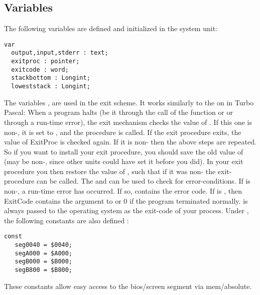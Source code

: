 \documentclass{report}
\begin{document}
\subsection{Variables}
The following variables are defined and initialized in the system unit:
\begin{verbatim}
var
  output,input,stderr : text;
  exitproc : pointer;
  exitcode : word;
  stackbottom : Longint;
  loweststack : Longint;
\end{verbatim}
The variables ,  are used in the \fpc exit
scheme. It works similarly to the on in Turbo Pascal:
When a program halts (be it through the call of the  function or
 or through a run-time error), the exit mechanism checks the value
of . If this one is non-, it is set to , and
the procedure is called. If the exit procedure exits, the value of ExitProc
is checked again. If it is non- then the above steps are repeated.
So if you want to install your exit procedure, you should save the old value
of  (may be non-, since other units could have set it before
you did). In your exit procedure you then restore the value of
, such that if it was non- the exit-procedure can be
called.
The  and  can be used to check for
error-conditions. If  is non-, a run-time error has
occurred. If so,  contains the error code. If  is
, then {ExitCode} contains the argument to  or 0 if the
program terminated normally.
 is always passed to the operating system as the exit-code of
your process.
Under , the following constants are also defined :
\begin{verbatim}
const
   seg0040 = $0040;
   segA000 = $A000;
   segB000 = $B000;
   segB800 = $B800;
\end{verbatim}
These constants allow easy access to the bios/screen segment via mem/absolute.
\end{document}
